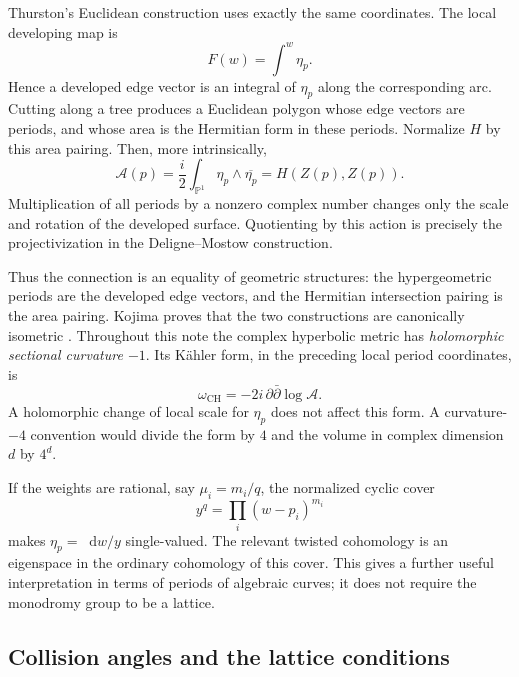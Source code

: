 \documentclass[11pt,a4paper]{article}
\numberwithin{equation}{section}
\theoremstyle{definition}
\theoremstyle{remark}
\newcommand{\dd}{\mathop{}\!\mathrm d}
\begin{document}
Thurston's Euclidean construction uses exactly the same coordinates.
The local developing map is
\[
 F(w)=\int^w\eta_p.
\]
Hence a developed edge vector is an integral of $\eta_p$ along the
corresponding arc. Cutting along a tree produces a Euclidean polygon
whose edge vectors are periods, and whose area is the Hermitian form
in these periods. Normalize $H$ by this area pairing. Then, more
intrinsically,
\begin{equation}
 \mathcal A(p)=\frac{i}{2}\int_{\mathbb P^1}\eta_p\wedge\overline{\eta_p}
             =H(Z(p),Z(p)).
 \label{eq:DMarea}
\end{equation}
Multiplication of all periods by a nonzero complex number changes only
the scale and rotation of the developed surface. Quotienting by this
action is precisely the projectivization in the Deligne--Mostow
construction.

Thus the connection is an equality of geometric structures: the
hypergeometric periods are the developed edge vectors, and the
Hermitian intersection pairing is the area pairing. Kojima proves that
the two constructions are canonically isometric
\cite[Theorem 4.3]{Kojima}. Throughout this note the complex hyperbolic
metric has \emph{holomorphic sectional curvature $-1$}. Its K\"ahler
form, in the preceding local period coordinates, is
\begin{equation}
 \omega_{\mathrm{CH}}=-2i\,\partial\bar\partial\log\mathcal A.
 \label{eq:CHpotential}
\end{equation}
A holomorphic change of local scale for $\eta_p$ does not affect this
form. A curvature-$-4$ convention would divide the form by $4$ and
the volume in complex dimension $d$ by $4^d$.

If the weights are rational, say $\mu_i=m_i/q$, the normalized cyclic
cover
\[
 y^q=\prod_i(w-p_i)^{m_i}
\]
makes $\eta_p=\dd w/y$ single-valued. The relevant twisted cohomology is
an eigenspace in the ordinary cohomology of this cover. This gives a
further useful interpretation in terms of periods of algebraic curves;
it does not require the monodromy group to be a lattice.

\subsection{Collision angles and the lattice conditions}
\end{document}
